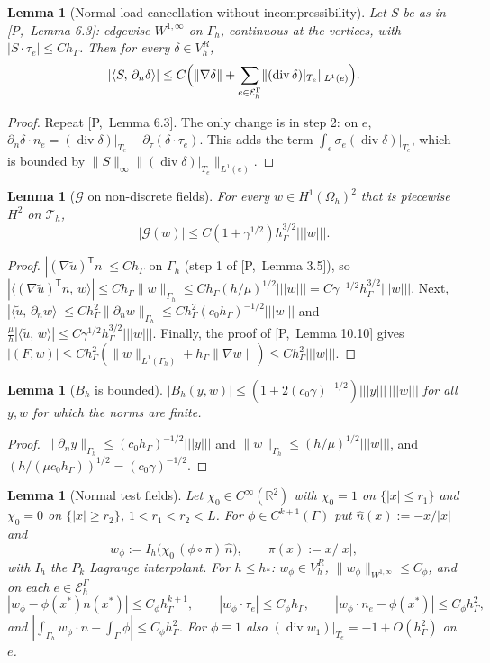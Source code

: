 \documentclass[11pt,reqno]{amsart}
\theoremstyle{plain}
\newtheorem{lemma}[theorem]{Lemma}
\theoremstyle{definition}
\newcommand{\R}{\mathbb R}
\newcommand{\hG}{h_\Gamma}
\newcommand{\Gh}{\Gamma_h}
\newcommand{\Oh}{\Omega_h}
\newcommand{\Th}{\mathcal T_h}
\newcommand{\EG}{\mathcal E_h^\Gamma}
\newcommand{\VR}{V_h^R}
\newcommand{\dn}{\partial_n}
\newcommand{\dt}{\partial_\tau}
\newcommand{\ut}{\tilde u}
\newcommand{\ip}[2]{\langle #1,\, #2\rangle}
\newcommand{\tnorm}[1]{|\!|\!|#1|\!|\!|}
\newcommand{\norm}[1]{\lVert #1\rVert}
\renewcommand{\div}{\operatorname{div}}
\newcommand{\Gc}{\mathcal G}
\newcommand{\Pref}[1]{\textup{[P,~#1]}}
\newcommand{\Bh}{B_h}
\begin{document}
\begin{lemma}[Normal-load cancellation without incompressibility]\label{pd:lem:cancel}
Let $S$ be as in \Pref{Lemma 6.3}: edgewise $W^{1,\infty}$ on $\Gh$, continuous at the vertices, with $|S\cdot\tau_e|\le C\hG$. Then for every $\delta\in\VR$,
\[
|\ip S{\dn\delta}|\le C\Bigl(\norm{\nabla\delta}+\sum_{e\in\EG}\norm{(\div\delta)|_{T_e}}_{L^1(e)}\Bigr).
\]
\end{lemma}

\begin{proof}
Repeat \Pref{Lemma 6.3}. The only change is in step 2: on $e$, $\dn\delta\cdot n_e=(\div\delta)|_{T_e}-\dt(\delta\cdot\tau_e)$. This adds the term $\int_e\sigma_e(\div\delta)|_{T_e}$, which is bounded by $\norm S_\infty\norm{(\div\delta)|_{T_e}}_{L^1(e)}$.
\end{proof}

\begin{lemma}[$\Gc$ on non-discrete fields]\label{pd:lem:G}
For every $w\in H^1(\Oh)^2$ that is piecewise $H^2$ on $\Th$,
\[
|\Gc(w)|\le C(1+\gamma^{1/2})\hG^{3/2}\tnorm w .
\]
\end{lemma}

\begin{proof}
$|(\nabla\ut)^{\mathsf T}n|\le C\hG$ on $\Gh$ (step 1 of \Pref{Lemma 3.5}), so $|\ip{(\nabla\ut)^{\mathsf T}n}w|\le C\hG\norm w_{\Gh}\le C\hG(h/\mu)^{1/2}\tnorm w=C\gamma^{-1/2}\hG^{3/2}\tnorm w$. Next, $|\ip\ut{\dn w}|\le C\hG^2\norm{\dn w}_{\Gh}\le C\hG^2(c_0\hG)^{-1/2}\tnorm w$ and $\frac\mu h|\ip\ut w|\le C\gamma^{1/2}\hG^{3/2}\tnorm w$. Finally, the proof of \Pref{Lemma 10.10} gives $|(F,w)|\le C\hG^2(\norm w_{L^1(\Gh)}+\hG\norm{\nabla w})\le C\hG^2\tnorm w$.
\end{proof}

\begin{lemma}[$\Bh$ is bounded]\label{pd:lem:Bh}
$|\Bh(y,w)|\le(1+2(c_0\gamma)^{-1/2})\tnorm y\,\tnorm w$ for all $y,w$ for which the norms are finite.
\end{lemma}

\begin{proof}
$\norm{\dn y}_{\Gh}\le(c_0\hG)^{-1/2}\tnorm y$ and $\norm w_{\Gh}\le(h/\mu)^{1/2}\tnorm w$, and $(h/(\mu c_0\hG))^{1/2}=(c_0\gamma)^{-1/2}$.
\end{proof}

\begin{lemma}[Normal test fields]\label{pd:lem:wphi}
Let $\chi_0\in C^\infty(\R^2)$ with $\chi_0=1$ on $\{|x|\le r_1\}$ and $\chi_0=0$ on $\{|x|\ge r_2\}$, $1<r_1<r_2<L$. For $\phi\in C^{k+1}(\Gamma)$ put $\hat n(x):=-x/|x|$ and
\[
w_\phi:=I_h\bigl(\chi_0\,(\phi\circ\pi)\,\hat n\bigr),\qquad\pi(x):=x/|x|,
\]
with $I_h$ the $P_k$ Lagrange interpolant. For $h\le h_\ast$: $w_\phi\in\VR$, $\norm{w_\phi}_{W^{1,\infty}}\le C_\phi$, and on each $e\in\EG$
\[
|w_\phi-\phi(x^\ast)n(x^\ast)|\le C_\phi\hG^{k+1},\qquad |w_\phi\cdot\tau_e|\le C_\phi\hG,\qquad |w_\phi\cdot n_e-\phi(x^\ast)|\le C_\phi\hG^2,
\]
and $|\int_{\Gh}w_\phi\cdot n-\int_\Gamma\phi|\le C_\phi\hG^2$. For $\phi\equiv1$ also $(\div w_1)|_{T_e}=-1+O(\hG^2)$ on $e$.
\end{lemma}
\end{document}
